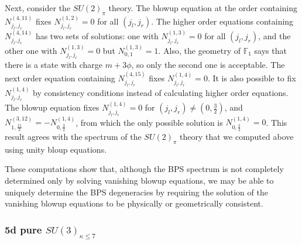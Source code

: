 Next, consider the $ SU(2)_\pi $ theory. The blowup equation at the order containing $ N_{j_l, j_r}^{(4, 11)} $ fixes $ N_{j_l, j_r}^{(1, 2)} = 0 $ for all $ (j_l, j_r) $. The higher order equations containing $ N_{j_l, j_r}^{(4, 14)} $ has two sets of solutions: one with $ N_{j_l, j_r}^{(1, 3)} = 0 $ for all $ (j_l, j_r) $, and the other one with $ N_{j_l, j_r}^{(1, 3)} = 0 $ but $ N_{0, 1}^{(1, 3)} = 1 $. Also, the geometry of $\mathbb{F}_1$ says that there is a state with charge $ m + 3\phi $, so only the second one is acceptable. The next order equation containing $ N_{j_l, j_r}^{(4, 15)} $ fixes $ N_{j_l, j_r}^{(1, 4)} = 0 $. It is also possible to fix $ N_{j_l, j_r}^{(1, 4)} $ by consistency conditions instead of calculating higher order equations. The blowup equation fixes $ N_{j_l, j_r}^{(1, 4)} = 0 $  for $ (j_l, j_r) \neq (0, \frac{3}{2}) $, and $N_{1,\frac{15}{2}}^{(3,12)} = - N_{0,\frac{3}{2}}^{(1, 4)}$, from which the only possible solution is $ N_{0,\frac{3}{2}}^{(1, 4)} = 0 $. This result agrees with the spectrum of the $ SU(2)_\pi $ theory that we computed above using unity bloup equations. 

These computations show that, although the BPS spectrum is not completely determined only by solving vanishing blowup equations, we may be able to uniquely determine the BPS degeneracies by requiring the solution of the vanishing blowup equations to be physically or geometrically consistent.


\subsubsection{\texorpdfstring{5d pure $SU(3)_{\kappa \leq 7}$}{5d pure SU(3)k}}\label{sec:su3_k}

